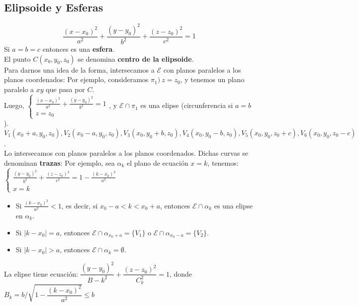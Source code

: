 \documentclass[11pt,a4paper]{article}
\begin{document}
\subsection{Elipsoide y Esferas}
$$\frac{(x-x_0)^2}{a^2} + \frac{(y-y_0)^2}{b^2} + \frac{(z-z_0)^2}{c^2} = 1$$
Si $a = b = c$ entonces es una \textbf{esfera}. \\
El punto $C(x_0, y_0, z_0)$ se denomina \textbf{centro de la elipsoide}. \\
Para darnos una idea de la forma, intersecamos a $\mathcal{E}$ con planos paralelos a los planos coordenados:
Por ejemplo, consideramos $\pi_1)\ z = z_0$, y tenemos un plano paralelo a $xy$ que pasa por $C$.\\
Luego, $\left\{ \begin{array}{l} \frac{(x-x_0)^2}{a^2} + \frac{(y-y_0)^2}{b^2} = 1 \\ z = z_0 \end{array} \right.$, y $\mathcal{E} \cap \pi_1$ es una elipse (circunferencia si $a = b$).\\
$V_1(x_0 + a, y_0, z_0), V_2(x_0 - a, y_0, z_0), V_3(x_0, y_0 + b, z_0), V_4(x_0, y_0 - b, z_0), V_5(x_0, y_0, z_0 + c), V_6(x_0, y_0, z_0 - c)$.\\
Lo intersecamos con planos paralelos a los planos coordenados. Dichas curvas se denominan \textbf{trazas}: 
Por ejemplo, sea $\alpha_k$ el plano de ecuaci\'on $x = k$, tenemos: 
$\left\{ \begin{array}{l} \frac{(y-y_0)^2}{b^2} + \frac{(z-z_0)^2}{c^2} = 1 - \frac{(k-x_0)^2}{a^2} \\ x = k \end{array} \right.$
\begin{itemize}
\itemsep-0.3em
\item Si $\frac{(k-x_0)^2}{a^2} < 1$, es decir, si $x_0 - a < k < x_0 + a$, entonces $\mathcal{E} \cap \alpha_k$ es una elipse en $\alpha_k$.
\item Si $|k-x_0| = a$, entonces $\mathcal{E} \cap \alpha_{x_0 + a} = \{ V_1 \}$ o $\mathcal{E} \cap \alpha_{x_0 - a} = \{ V_2 \}$.
\item Si $|k-x_0| > a$, entonces $\mathcal{E} \cap \alpha_k = \emptyset$.
\end{itemize}
La elipse tiene ecuaci\'on: $\dfrac{(y-y_0)^2}{B-k^2} + \dfrac{(z-z_0)^2}{C_k^2} = 1$, donde $B_k = b/\sqrt{1 - \dfrac{(k - x_0)^2}{a^2}} \leq b$
\end{document}
